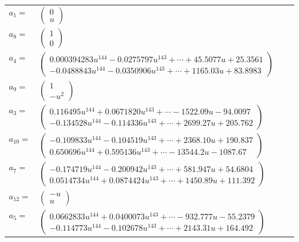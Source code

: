 \documentclass[1p]{elsarticle_modified}
\theoremstyle{definition}
\begin{document}
\begin{tabular}{m{7pt} m{180pt} m{7pt} m{180pt} }
\flushright $a_{1}=$&$\begin{pmatrix}0\\u\end{pmatrix}$ \\
\flushright $a_{8}=$&$\begin{pmatrix}1\\0\end{pmatrix}$ \\
\flushright $a_{4}=$&$\begin{pmatrix}0.000394283 u^{144}-0.0275797 u^{143}+\cdots+45.5077 u+25.3561\\-0.0488843 u^{144}-0.0350906 u^{143}+\cdots+1165.03 u+83.8983\end{pmatrix}$ \\
\flushright $a_{9}=$&$\begin{pmatrix}1\\- u^2\end{pmatrix}$ \\
\flushright $a_{3}=$&$\begin{pmatrix}0.116495 u^{144}+0.0671820 u^{143}+\cdots-1522.09 u-94.0097\\-0.134528 u^{144}-0.114336 u^{143}+\cdots+2699.27 u+205.762\end{pmatrix}$ \\
\flushright $a_{10}=$&$\begin{pmatrix}-0.109833 u^{144}-0.104519 u^{143}+\cdots+2368.10 u+190.837\\0.650696 u^{144}+0.595136 u^{143}+\cdots-13544.2 u-1087.67\end{pmatrix}$ \\
\flushright $a_{7}=$&$\begin{pmatrix}-0.174719 u^{144}-0.200942 u^{143}+\cdots+581.947 u+54.6804\\0.0514734 u^{144}+0.0874424 u^{143}+\cdots+1450.89 u+111.392\end{pmatrix}$ \\
\flushright $a_{12}=$&$\begin{pmatrix}- u\\u\end{pmatrix}$ \\
\flushright $a_{5}=$&$\begin{pmatrix}0.0662833 u^{144}+0.0400073 u^{143}+\cdots-932.777 u-55.2379\\-0.114773 u^{144}-0.102678 u^{143}+\cdots+2143.31 u+164.492\end{pmatrix}$ \\

\end{tabular}
\end{document}
